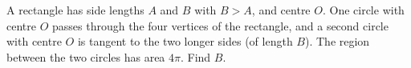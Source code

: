 A rectangle has side lengths $A$ and $B$ with $B>A$, and centre $O$. One circle with centre $O$ passes through the four vertices of the rectangle, and a second circle with centre $O$ is tangent to the two longer sides (of length $B$). The region between the two circles has area $4\pi$. Find $B$.
